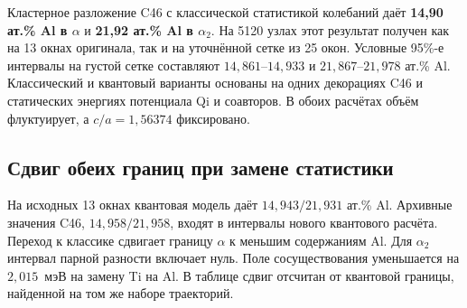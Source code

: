 \documentclass[11pt,a4paper]{article}
\begin{document}
\thispagestyle{plain}
\vspace{3mm}
\vspace{1mm}
\vspace{2mm}\noindent{\color{teal}\rule{\linewidth}{1pt}}\par\vspace{1mm}
\noindent Кластерное разложение C46 с классической статистикой колебаний даёт
\textbf{14,90 ат.\% Al в \(\alpha\)} и
\textbf{21,92 ат.\% Al в \(\alpha_2\)}.
На 5120 узлах этот результат получен как на 13 окнах оригинала, так и на
уточнённой сетке из 25 окон. Условные 95\%-е интервалы на густой сетке
составляют \(14{,}861\)--\(14{,}933\) и \(21{,}867\)--\(21{,}978\)
ат.\% Al. Классический и квантовый варианты основаны на
одних декорациях C46 и статических энергиях потенциала Qi и соавторов.
В обоих расчётах объём флуктуирует, а \(c/a=1{,}56374\) фиксировано.

\subsection*{Сдвиг обеих границ при замене статистики}
На исходных 13 окнах квантовая модель даёт \(14{,}943/21{,}931\) ат.\%
Al. Архивные значения C46, \(14{,}958/21{,}958\), входят в интервалы
нового квантового расчёта. Переход к классике сдвигает границу
\(\alpha\) к меньшим содержаниям Al. Для \(\alpha_2\) интервал парной разности
включает нуль. Поле сосуществования уменьшается на \(2{,}015\)~мэВ на
замену Ti на Al. В таблице сдвиг отсчитан от квантовой границы, найденной
на том же наборе траекторий.
\end{document}
